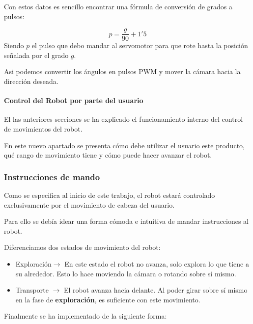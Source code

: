 \documentclass[twoside, 11pt]{epstfg}
\begin{document}
Con estos datos es sencillo encontrar una fórmula de conversión de grados a pulsos:

$$p = \frac{g}{90} + 1'5$$
Siendo $p$ el pulso que debo mandar al servomotor para que rote hasta la posición señalada por el grado $g$.

Asi podemos convertir los ángulos en pulsos PWM y mover la cámara hacia la dirección deseada.

\paragraph{Control del Robot por parte del usuario}

El las anteriores secciones se ha explicado el funcionamiento interno del control de movimientos del robot.

En este nuevo apartado se presenta cómo debe utilizar el usuario este producto, qué rango de movimiento tiene y cómo puede hacer avanzar el robot.

\subsubsection{\textbf{Instrucciones de mando}}

Como se especifica al inicio de este trabajo, el robot estará controlado exclusivamente por el movimiento de cabeza del usuario.

Para ello se debía idear una forma cómoda e intuitiva de mandar instrucciones al robot.

Diferenciamos dos estados de movimiento del robot:
\begin{itemize}
	\item Exploración$\rightarrow$ En este estado el robot no avanza, solo explora lo que tiene a su alrededor. Esto lo hace moviendo la cámara o rotando sobre sí mismo.
	\item Transporte $\rightarrow$ El robot avanza hacia delante. Al poder girar sobre sí mismo en la fase de \textbf{exploración}, es suficiente con este movimiento.
\end{itemize}

Finalmente se ha implementado de la siguiente forma:
\end{document}
